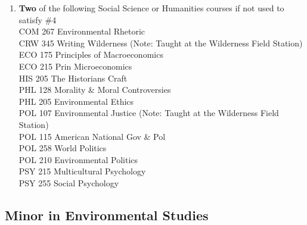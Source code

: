 \documentclass[
  letterpaper,
]{scrbook}
\begin{document}
\begin{enumerate}
  BIO 175 Field Botany\\
  BIO 185/185L Entomology and Lab (Note: Taught at the Wilderness Field
  Station)\\
  BIO 285/285L Animal Behavior and Lab (Note: Taught at the Wilderness
  Field Station)\\
  BIO 203 Northwoods Ecology (Note: Taught at the Wilderness Field
  Station)\\
  BIO 275 Aquatic Ecology (Note: Taught at the Wilderness Field
  Station)\\
  BIO 295/295L Spatial Ecology and Laboratory (WE)\\
  CHM 103/103L Selected Concepts in Chemistry and Laboratory \textbf{or}
  CHM 121/121L General Chemistry I and Laboratory\\
  PHY 161 Energy: Science and Technology\\
  PHY 311 Renewable Energy (WE)\\
\item
  \textbf{Two} of the following Social Science or Humanities courses if
  not used to satisfy \#4\\
  COM 267 Environmental Rhetoric\\
  CRW 345 Writing Wilderness (Note: Taught at the Wilderness Field
  Station)\\
  ECO 175 Principles of Macroeconomics\\
  ECO 215 Prin Microeconomics\\
  HIS 205 The Historians Craft\\
  PHL 128 Morality \& Moral Controversies\\
  PHL 205 Environmental Ethics\\
  POL 107 Environmental Justice (Note: Taught at the Wilderness Field
  Station)\\
  POL 115 American National Gov \& Pol\\
  POL 258 World Politics\\
  POL 210 Environmental Politics\\
  PSY 215 Multicultural Psychology\\
  PSY 255 Social Psychology
\end{enumerate}

\subsection{Minor in Environmental
Studies}\label{minor-in-environmental-studies}
\end{document}
